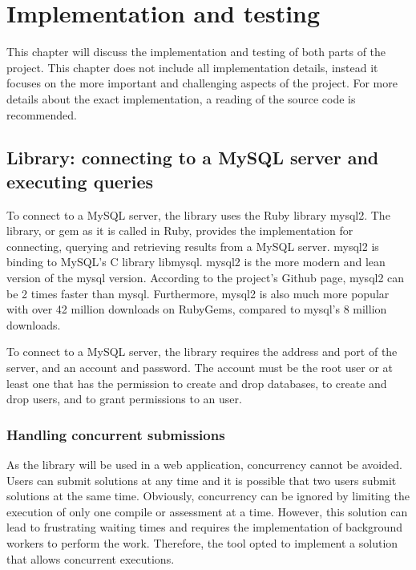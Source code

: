  \chapter{Implementation and testing}

This chapter will discuss the implementation and testing of both parts of the project. This chapter does not include all implementation details, instead it focuses on the more important and challenging aspects of the project. For more details about the exact implementation, a reading of the source code is recommended.

\section{Library: connecting to a MySQL server and executing queries} \label{ch:impllib:sec:connecting}
To connect to a MySQL server, the library uses the Ruby library mysql2. The library, or gem as it is called in Ruby, provides the implementation for connecting, querying and retrieving results from a MySQL server. mysql2 is binding to MySQL's C library libmysql. mysql2 is the more modern and lean version of the mysql version. According to the project's Github page, mysql2 can be 2 times faster than mysql. Furthermore, mysql2 is also much more popular with over 42 million downloads on RubyGems, compared to mysql's 8 million downloads.

To connect to a MySQL server, the library requires the address and port of the server, and an account and password. The account must be the root user or at least one that has the permission to create and drop databases, to create and drop users, and to grant permissions to an user.

\subsection{Handling concurrent submissions}

As the library will be used in a web application, concurrency cannot be avoided. Users can submit solutions at any time and it is possible that two users submit solutions at the same time. Obviously, concurrency can be ignored by limiting the execution of only one compile or assessment at a time. However, this solution can lead to frustrating waiting times and requires the implementation of background workers to perform the work. Therefore, the tool opted to implement a solution that allows concurrent executions.

